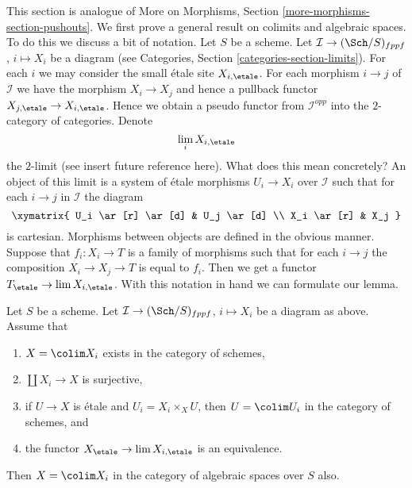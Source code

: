 \noindent
This section is analogue of
More on Morphisms, Section \ref{more-morphisms-section-pushouts}.
We first prove a general result on colimits and algebraic spaces.
To do this we discuss a bit of notation. Let $S$ be a scheme.
Let $\mathcal{I} \to (\Sch/S)_{fppf}$, $i \mapsto X_i$
be a diagram (see Categories, Section \ref{categories-section-limits}).
For each $i$ we may consider the small \'etale site $X_{i, \etale}$.
For each morphism $i \to j$ of $\mathcal{I}$ we have the morphism
$X_i \to X_j$ and hence a pullback functor
$X_{j, \etale} \to X_{i, \etale}$.
Hence we obtain a pseudo functor from $\mathcal{I}^{opp}$ into
the $2$-category of categories. Denote
$$
\lim_i X_{i, \etale}
$$
the $2$-limit (see insert future reference here). What does this mean
concretely? An object of this limit is a system of \'etale morphisms
$U_i \to X_i$ over $\mathcal{I}$ such that for each $i \to j$ in
$\mathcal{I}$ the diagram
$$
\xymatrix{
U_i \ar[r] \ar[d] & U_j \ar[d] \\
X_i \ar[r] & X_j
}
$$
is cartesian. Morphisms between objects are defined in the obvious manner.
Suppose that $f_i : X_i \to T$ is a family of morphisms such that
for each $i \to j$ the composition $X_i \to X_j \to T$ is equal to $f_i$.
Then we get a functor $T_\etale \to \lim X_{i, \etale}$.
With this notation in hand we can formulate our lemma.

\begin{lemma}
\label{lemma-colimit-agrees}
Let $S$ be a scheme. Let $\mathcal{I} \to (\Sch/S)_{fppf}$, $i \mapsto X_i$
be a diagram as above. Assume that
\begin{enumerate}
\item $X = \colim X_i$ exists in the category of schemes,
\item $\coprod X_i \to X$ is surjective,
\item if $U \to X$ is \'etale and $U_i = X_i \times_X U$, then
$U = \colim U_i$ in the category of schemes, and
\item the functor $X_\etale \to \lim X_{i, \etale}$
is an equivalence.
\end{enumerate}
Then $X = \colim X_i$ in the category of algebraic spaces over $S$ also.
\end{lemma}

